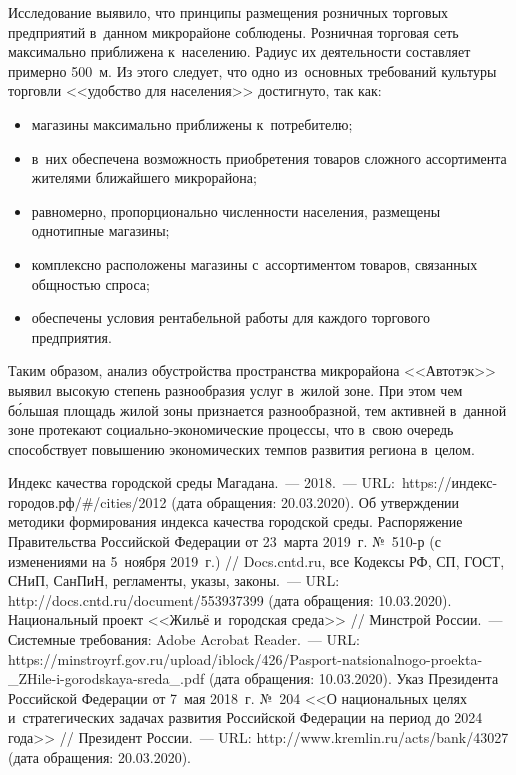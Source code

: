 Исследование выявило, что принципы размещения розничных торговых предприятий в~данном микрорайоне соблюдены. Розничная торговая сеть максимально приближена к~населению. Радиус их деятельности составляет примерно 500~м. Из этого следует, что одно из~основных требований культуры торговли <<удобство для населения>> достигнуто, так как:
\begin{itemize}[noitemsep]\vspace{-8pt}
\item магазины максимально приближены к~потребителю;
\item в~них обеспечена возможность приобретения товаров сложного ассортимента жителями ближайшего микрорайона;
\item равномерно, пропорционально численности населения, размещены однотипные магазины;
\item комплексно расположены магазины с~ассортиментом товаров, связанных общностью спроса;
\item обеспечены условия рентабельной работы для каждого торгового предприятия.
\end{itemize}\vspace{-8pt}

Таким образом, анализ обустройства пространства микрорайона <<Автотэк>> выявил высокую степень разнообразия услуг в~жилой зоне. При этом чем б\'{о}льшая площадь жилой зоны признается разнообразной, тем активней в~данной зоне протекают социально-экономические процессы, что в~свою очередь способствует повышению экономических темпов развития региона в~целом.


\begin{thebibliography}{99}
\bibitem{}Индекс качества городской среды Магадана.~--- 2018.~--- URL:~https://индекс-городов.рф/\#/cities/2012 (дата обращения: 20.03.2020).
\bibitem{}Об утверждении методики формирования индекса качества городской среды. Распоряжение Правительства Российской Федерации от 23~марта 2019~г. №~510-р (с изменениями на 5~ноября 2019~г.) // Docs.cntd.ru, все Кодексы РФ, СП, ГОСТ, СНиП, СанПиН, регламенты, указы, законы.~--- URL: http://docs.cntd.ru/document/553937399 (дата обращения: 10.03.2020).
\bibitem{}Национальный проект <<Жильё и~городская среда>> // Минстрой России.~--- Системные требования: Adobe Acrobat Reader.~--- URL: https://minstroyrf.gov.ru/upload/iblock/426/Pasport-natsionalnogo-proekta-\_ZHile-i-gorodskaya-sreda\_.pdf (дата обращения: 10.03.2020).
\bibitem{}Указ Президента Российской Федерации от 7~мая 2018~г. №~204 <<О национальных целях и~стратегических задачах развития Российской Федерации на период до 2024 года>> // Президент России.~--- URL: http://www.kremlin.ru/acts/bank/43027 (дата обращения: 20.03.2020).

\end{thebibliography}
